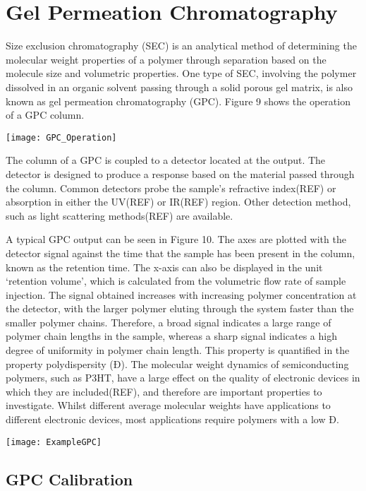 \section{Gel Permeation Chromatography}

Size exclusion chromatography (SEC) is an analytical method of determining the molecular weight properties of a polymer through separation based on the molecule size and volumetric properties. One type of SEC, involving the polymer dissolved in an organic solvent passing through a solid porous gel matrix, is also known as gel permeation chromatography (GPC). Figure 9 shows the operation of a GPC column.

\texttt{[image: GPC\_Operation]}

The column of a GPC is coupled to a detector located at the output. The detector is designed to produce a response based on the material passed through the column. Common detectors probe the sample’s refractive index(REF) or absorption in either the UV(REF) or IR(REF) region. Other detection method, such as light scattering methods(REF) are available.

A typical GPC output can be seen in Figure 10. The axes are plotted with the detector signal against the time that the sample has been present in the column, known as the retention time. The x-axis can also be displayed in the unit ‘retention volume’, which is calculated from the volumetric flow rate of sample injection. The signal obtained increases with increasing polymer concentration at the detector, with the larger polymer eluting through the system faster than the smaller polymer chains. Therefore, a broad signal indicates a large range of polymer chain lengths in the sample, whereas a sharp signal indicates a high degree of uniformity in polymer chain length. This property is quantified in the property polydispersity (Đ). The molecular weight dynamics of semiconducting polymers, such as P3HT, have a large effect on the quality of electronic devices in which they are included(REF), and therefore are important properties to investigate. Whilst different average molecular weights have applications to different electronic devices, most applications require polymers with a low Đ. 

\texttt{[image: ExampleGPC]}

\subsection{GPC Calibration}

